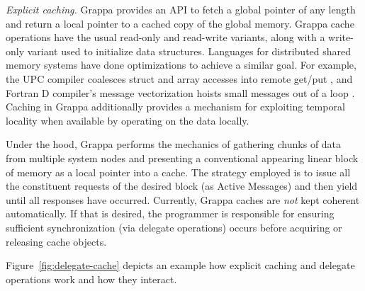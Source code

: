 \vspace{1ex}
\textit{Explicit caching.} Grappa provides an API to fetch a global pointer of
any length and return a local pointer to a cached copy of the global memory.
Grappa cache operations have the usual read-only and read-write variants,
along with a write-only variant used to initialize data structures. Languages
for distributed shared memory systems have done optimizations to achieve a
similar goal. For example, the UPC compiler coalesces struct and array
accesses into remote get/put \cite{Chen:2005}, and Fortran D compiler's
message vectorization hoists small messages out of a loop
\cite{FortranD:1992}. Caching in Grappa additionally provides a mechanism for
exploiting temporal locality when available by operating on the data locally.

Under the hood, Grappa performs the mechanics of gathering chunks of data from
multiple system nodes and presenting a conventional appearing linear block of
memory as a local pointer into a cache. The strategy employed is to issue all
the constituent requests of the desired block (as Active Messages) and then
yield until all responses have occurred. Currently, Grappa caches are
\emph{not} kept coherent automatically. If that is desired, the programmer is
responsible for ensuring sufficient synchronization (via delegate operations)
occurs before acquiring or releasing cache objects.

Figure~\ref{fig:delegate-cache} depicts an example how explicit caching and
delegate operations work and how they interact.

